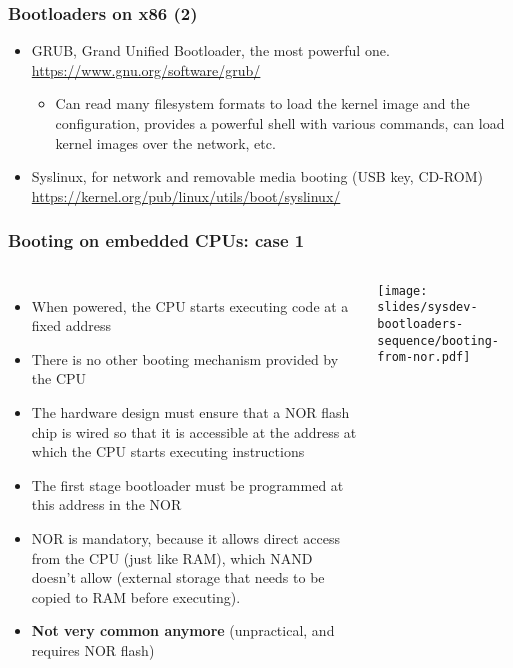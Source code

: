 \begin{frame}
  \frametitle{Bootloaders on x86 (2)}
  \begin{itemize}
  \item GRUB, Grand Unified Bootloader, the most powerful one.\\
    \url{https://www.gnu.org/software/grub/}
    \begin{itemize}
    \item Can read many filesystem formats to load the kernel image
      and the configuration, provides a powerful shell with various
      commands, can load kernel images over the network, etc.
    \end{itemize}
  \item Syslinux, for network and removable media booting (USB key, CD-ROM)\\
    \small\url{https://kernel.org/pub/linux/utils/boot/syslinux/}\normalsize
  \end{itemize}
\end{frame}

\begin{frame}
  \frametitle{Booting on embedded CPUs: case 1}
  \begin{columns}
    \begin{itemize}
    \item When powered, the CPU starts executing code at a fixed address
    \item There is no other booting mechanism provided by the CPU
    \item The hardware design must ensure that a NOR flash chip is
      wired so that it is accessible at the address at which the CPU
      starts executing instructions
    \item The first stage bootloader must be programmed at this
      address in the NOR
    \item NOR is mandatory, because it allows direct access from the CPU
      (just like RAM), which NAND doesn't allow (external storage that
      needs to be copied to RAM before executing).
    \item {\bf Not very common anymore} (unpractical, and requires NOR
      flash)
    \end{itemize}
    \texttt{[image: slides/sysdev-bootloaders-sequence/booting-from-nor.pdf]}
  \end{columns}
\end{frame}


